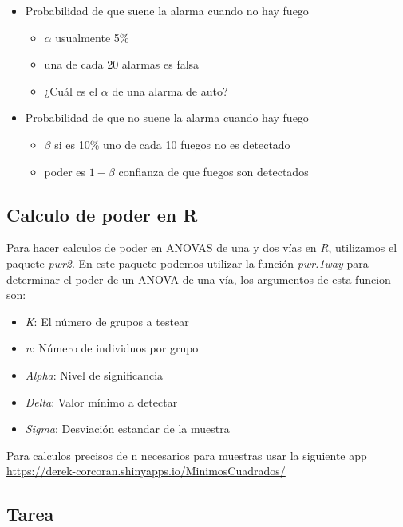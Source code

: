 \documentclass[]{article}
\providecommand{\tightlist}{%
  \setlength{\itemsep}{0pt}\setlength{\parskip}{0pt}}
\begin{document}
\begin{itemize}
\tightlist
\item
  Probabilidad de que suene la alarma cuando no hay fuego

  \begin{itemize}
  \tightlist
  \item
    \(\alpha\) usualmente 5\%
  \item
    una de cada 20 alarmas es falsa
  \item
    ¿Cuál es el \(\alpha\) de una alarma de auto?
  \end{itemize}
\item
  Probabilidad de que no suene la alarma cuando hay fuego

  \begin{itemize}
  \tightlist
  \item
    \(\beta\) si es 10\% uno de cada 10 fuegos no es detectado
  \item
    poder es \(1-\beta\) confianza de que fuegos son detectados
  \end{itemize}
\end{itemize}

\subsection{Calculo de poder en R}\label{calculo-de-poder-en-r}

Para hacer calculos de poder en ANOVAS de una y dos vías en \emph{R},
utilizamos el paquete \emph{pwr2}. En este paquete podemos utilizar la
función \emph{pwr.1way} para determinar el poder de un ANOVA de una vía,
los argumentos de esta funcion son:

\begin{itemize}
\tightlist
\item
  \emph{K}: El número de grupos a testear
\item
  \emph{n}: Número de individuos por grupo
\item
  \emph{Alpha}: Nivel de significancia
\item
  \emph{Delta}: Valor mínimo a detectar
\item
  \emph{Sigma}: Desviación estandar de la muestra
\end{itemize}

Para calculos precisos de n necesarios para muestras usar la siguiente
app \url{https://derek-corcoran.shinyapps.io/MinimosCuadrados/}

\subsection{Tarea}\label{tarea}
\end{document}
